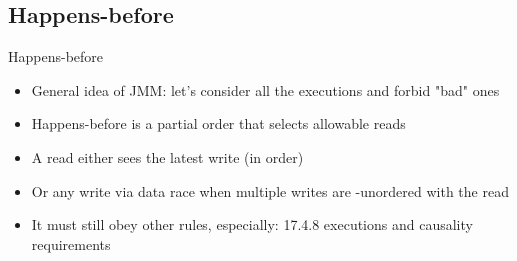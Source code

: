 \ifrender
\subsection{Happens-before}
\begin{frame}{Happens-before}
\begin{itemize}[<+->]
\item General idea of JMM: let's consider all the executions and forbid "bad" ones
\item Happens-before is a partial order that selects allowable reads
\item A read either sees the latest write (in {\hbbox} order)
\item Or any write via data race when multiple writes are {\hbbox}-unordered with the read
\item It must still obey other rules, especially: 17.4.8 executions and causality requirements
\end{itemize}
\end{frame}
\fi
